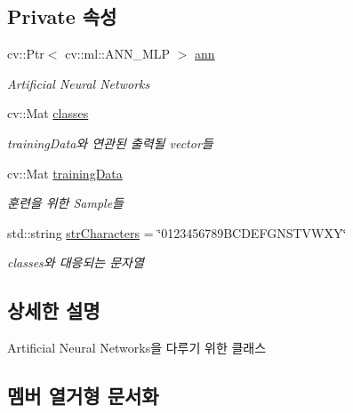 \subsection*{Private 속성}
\begin{DoxyCompactItemize}
\item 
\mbox{\label{class_o_c_r_a498a8acb578f60aad04d90704b2365b8}} 
cv\+::\+Ptr$<$ cv\+::ml\+::\+A\+N\+N\+\_\+\+M\+LP $>$ \hyperlink{class_o_c_r_a498a8acb578f60aad04d90704b2365b8}{ann}
\begin{DoxyCompactList}\small\item\em Artificial Neural Networks \end{DoxyCompactList}\item 
\mbox{\label{class_o_c_r_a57d7a81d01e81fa3008acc53074ce73f}} 
cv\+::\+Mat \hyperlink{class_o_c_r_a57d7a81d01e81fa3008acc53074ce73f}{classes}
\begin{DoxyCompactList}\small\item\em training\+Data와 연관된 출력될 vector들 \end{DoxyCompactList}\item 
\mbox{\label{class_o_c_r_a2c5101fa102a3fbb66144b3f511b3bd5}} 
cv\+::\+Mat \hyperlink{class_o_c_r_a2c5101fa102a3fbb66144b3f511b3bd5}{training\+Data}
\begin{DoxyCompactList}\small\item\em 훈련을 위한 Sample들 \end{DoxyCompactList}\item 
\mbox{\label{class_o_c_r_acc9af89294d62414e9e7ccddd2d169dc}} 
std\+::string \hyperlink{class_o_c_r_acc9af89294d62414e9e7ccddd2d169dc}{str\+Characters} = \char`\"{}0123456789\+B\+C\+D\+E\+F\+G\+N\+S\+T\+V\+W\+X\+Y\char`\"{}
\begin{DoxyCompactList}\small\item\em classes와 대응되는 문자열 \end{DoxyCompactList}\end{DoxyCompactItemize}


\subsection{상세한 설명}
Artificial Neural Networks을 다루기 위한 클래스 

\subsection{멤버 열거형 문서화}
\mbox{\label{class_o_c_r_a442cab5841719df30befa282835b4eb3}} 
